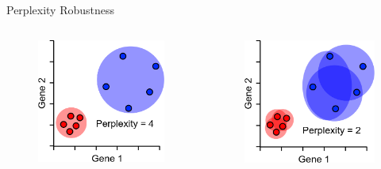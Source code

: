 \begin{frame}[allowframebreaks]{Perplexity Robustness}
    \begin{columns}
    \begin{column}{0.33\textwidth}
        \begin{figure}
            \centering
            \includegraphics[width=1\textwidth,keepaspectratio]{images/dul/dim-reduce/slide_29_1_img.png}
        \end{figure}
    \end{column}
    \begin{column}{0.33\textwidth}
        \begin{figure}
            \centering
            \includegraphics[width=1\textwidth,keepaspectratio]{images/dul/dim-reduce/slide_29_2_img.png}

\end{figure}
\end{column}
\end{columns}
\end{frame}
